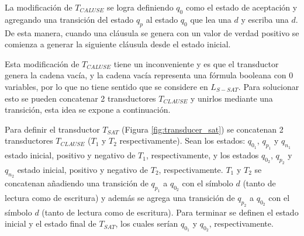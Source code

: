 La modificación de $T_{CALUSE}$ se logra definiendo $q_0$ como el estado de aceptación y agregando una transición del estado $q_p$ al estado $q_0$ que lea una $d$ y escriba una $d$. De esta manera, cuando una cláusula se genera con un valor de verdad positivo se comienza a generar la siguiente cláusula desde el estado inicial.

Esta modificación de $T_{CALUSE}$ tiene un inconveniente y es que el transductor genera la cadena vacía, y la cadena vacía representa una fórmula booleana con 0 variables, por lo que no tiene sentido que se considere en $L_{S-SAT}$. Para solucionar esto se pueden concatenar 2 transductores $T_{CLAUSE}$ y unirlos mediante una transición, esta idea se expone a continuación.

Para definir el transductor $T_{SAT}$ (Figura \ref{fig:transducer_sat}) se concatenan 2 transductores
$T_{CLAUSE}$ ($T_1$ y $T_2$ respectivamente). Sean los estados: $q_{0_1}$, $q_{p_1}$ y $q_{n_1}$ estado inicial,
positivo y negativo de $T_1$, respectivamente, y los estados $q_{0_2}$, $q_{p_2}$ y $q_{n_2}$ estado inicial,
positivo y negativo de $T_2$, respectivamente. $T_1$ y $T_2$ se concatenan añadiendo una transición de $q_{p_1}$ a $q_{0_2}$ con el símbolo $d$ (tanto de lectura como de escritura) y además se agrega una transición de $q_{p_2}$ a $q_{0_2}$ con el símbolo $d$ (tanto de lectura como de escritura).  Para terminar se definen el estado inicial y el estado final de $T_{SAT}$, los cuales serían $q_{0_1}$ y $q_{0_2}$, respectivamente.



